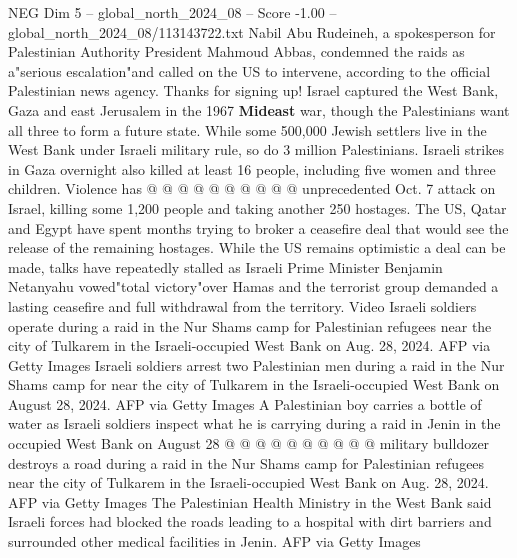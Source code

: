 \begin{textsample}{NEG Dim 5 – global\_north\_2024\_08 – Score -1.00 – global\_north\_2024\_08/113143722.txt}
Nabil Abu Rudeineh, a spokesperson for Palestinian Authority President Mahmoud Abbas, condemned the raids as a"serious escalation"and called on the US to intervene, according to the official Palestinian news agency.
Thanks for signing up!
Israel captured the West Bank, Gaza and east Jerusalem in the 1967 \textbf{Mideast} war, though the Palestinians want all three to form a future state.
While some 500,000 Jewish settlers live in the West Bank under Israeli military rule, so do 3 million Palestinians.
Israeli strikes in Gaza overnight also killed at least 16 people, including five women and three children.
Violence has @ @ @ @ @ @ @ @ @ @ unprecedented Oct. 7 attack on Israel, killing some 1,200 people and taking another 250 hostages.
The US, Qatar and Egypt have spent months trying to broker a ceasefire deal that would see the release of the remaining hostages.
While the US remains optimistic a deal can be made, talks have repeatedly stalled as Israeli Prime Minister Benjamin Netanyahu vowed"total victory"over Hamas and the terrorist group demanded a lasting ceasefire and full withdrawal from the territory.
Video Israeli soldiers operate during a raid in the Nur Shams camp for Palestinian refugees near the city of Tulkarem in the Israeli-occupied West Bank on Aug. 28, 2024.
AFP via Getty Images Israeli soldiers arrest two Palestinian men during a raid in the Nur Shams camp for near the city of Tulkarem in the Israeli-occupied West Bank on August 28, 2024.
AFP via Getty Images A Palestinian boy carries a bottle of water as Israeli soldiers inspect what he is carrying during a raid in Jenin in the occupied West Bank on August 28 @ @ @ @ @ @ @ @ @ @ military bulldozer destroys a road during a raid in the Nur Shams camp for Palestinian refugees near the city of Tulkarem in the Israeli-occupied West Bank on Aug. 28, 2024.
AFP via Getty Images The Palestinian Health Ministry in the West Bank said Israeli forces had blocked the roads leading to a hospital with dirt barriers and surrounded other medical facilities in Jenin.
AFP via Getty Images

\end{textsample}
